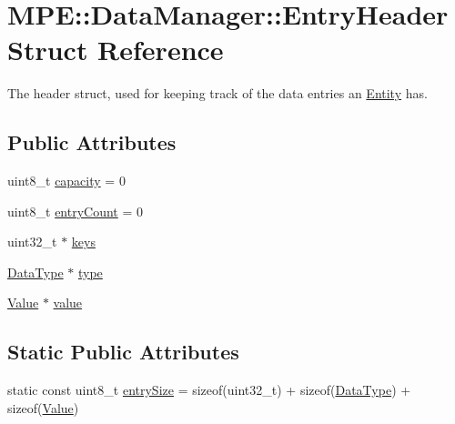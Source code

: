 \hypertarget{struct_m_p_e_1_1_data_manager_1_1_entry_header}{}\section{M\+PE\+:\+:Data\+Manager\+:\+:Entry\+Header Struct Reference}
\label{struct_m_p_e_1_1_data_manager_1_1_entry_header}


The header struct, used for keeping track of the data entries an \hyperlink{struct_m_p_e_1_1_entity}{Entity} has.  


\subsection*{Public Attributes}
\begin{DoxyCompactItemize}
\item 
uint8\+\_\+t \hyperlink{struct_m_p_e_1_1_data_manager_1_1_entry_header_a0d7adc0b636e8c00d1d38b6b780a96da}{capacity} = 0
\item 
uint8\+\_\+t \hyperlink{struct_m_p_e_1_1_data_manager_1_1_entry_header_ae1f8d7e4b6363ba5af82c1c20b7a9d1f}{entry\+Count} = 0
\item 
uint32\+\_\+t $\ast$ \hyperlink{struct_m_p_e_1_1_data_manager_1_1_entry_header_a1147ac0d74ba9de830139b4f661a92c7}{keys}
\item 
\hyperlink{class_m_p_e_1_1_data_manager_aeebd98a9feed805f5ebd63276f003f5f}{Data\+Type} $\ast$ \hyperlink{struct_m_p_e_1_1_data_manager_1_1_entry_header_aff785b6cab9ad54f0f3a14e3f4ca5a11}{type}
\item 
\hyperlink{struct_m_p_e_1_1_data_manager_1_1_value}{Value} $\ast$ \hyperlink{struct_m_p_e_1_1_data_manager_1_1_entry_header_a56c968449fa90b40890ec0f9ec8b3736}{value}
\end{DoxyCompactItemize}
\subsection*{Static Public Attributes}
\begin{DoxyCompactItemize}
\item 
static const uint8\+\_\+t \hyperlink{struct_m_p_e_1_1_data_manager_1_1_entry_header_a8b73487b833524d0b1497e07f5f63129}{entry\+Size} = sizeof(uint32\+\_\+t) + sizeof(\hyperlink{class_m_p_e_1_1_data_manager_aeebd98a9feed805f5ebd63276f003f5f}{Data\+Type}) + sizeof(\hyperlink{struct_m_p_e_1_1_data_manager_1_1_value}{Value})
\end{DoxyCompactItemize}


